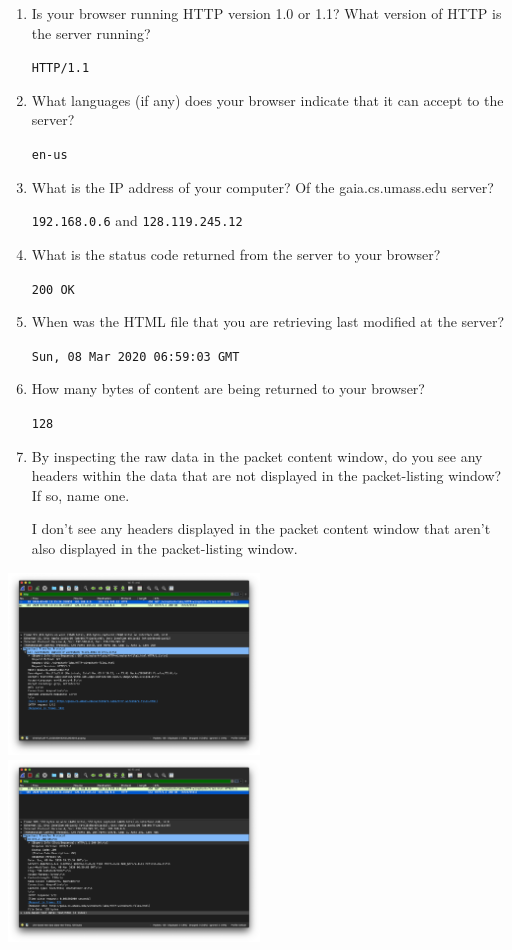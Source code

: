 \documentclass{article}
\begin{document}
\begin{enumerate}

\item Is your browser running HTTP version 1.0 or 1.1? What version of HTTP is the server running?

\texttt{HTTP/1.1}

\item What languages (if any) does your browser indicate that it can accept to the server?

\texttt{en-us}

\item What is the IP address of your computer? Of the gaia.cs.umass.edu server?

\texttt{192.168.0.6}\textsf{ and }\texttt{128.119.245.12}

\item What is the status code returned from the server to your browser?

\texttt{200 OK}

\item When was the HTML file that you are retrieving last modified at the server?

\texttt{Sun, 08 Mar 2020 06:59:03 GMT}

\item How many bytes of content are being returned to your browser?

\texttt{128}

\item By inspecting the raw data in the packet content window, do you see any headers within the data that are not displayed in the packet-listing window? If so, name one.

\textsf{I don't see any headers displayed in the packet content window that aren't also displayed in the packet-listing window.}

\end{enumerate}
\includegraphics[width=0.5\textwidth]{lab2_part1_get}
\includegraphics[width=0.5\textwidth]{lab2_part1_response}
\end{document}
